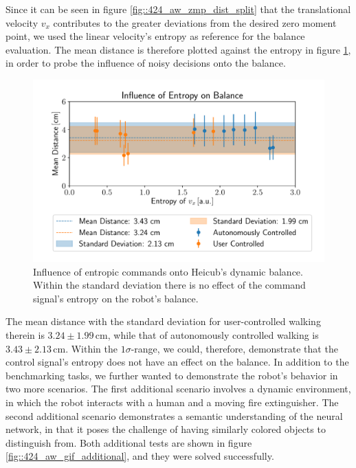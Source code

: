 Since it can be seen in figure \ref{fig::424_aw_zmp_dist_split} that the translational velocity $v_x$ contributes to the greater deviations from the desired zero moment point, we used the linear velocity's entropy as reference for the balance evaluation. The mean distance is therefore plotted against the entropy in figure \ref{fig::424_entropy_balance}, in order to probe the influence of noisy decisions onto the balance.
\begin{figure}[h!]
	\centering
	\includegraphics[scale=.5]{chapters/11_autonomous_walking_experiments/img/entropy_against_balance.pdf}
	\caption{Influence of entropic commands onto Heicub's dynamic balance. Within the standard deviation there is no effect of the command signal's entropy on the robot's balance.}
	\label{fig::424_entropy_balance}
\end{figure}
The mean distance with the standard deviation for user-controlled walking therein is $3.24\pm1.99\,\text{cm}$, while that of autonomously controlled walking is $3.43\pm2.13\,\text{cm}$. Within the $1\sigma$-range, we could, therefore, demonstrate that the control signal's entropy does not have an effect on the balance. In addition to the benchmarking tasks, we further wanted to demonstrate the robot's behavior in two more scenarios. The first additional scenario involves a dynamic environment, in which the robot interacts with a human and a moving fire extinguisher. The second additional scenario demonstrates a semantic understanding of the neural network, in that it poses the challenge of having similarly colored objects to distinguish from. Both additional tests are shown in figure \ref{fig::424_aw_gif_additional}, and they were solved successfully.

